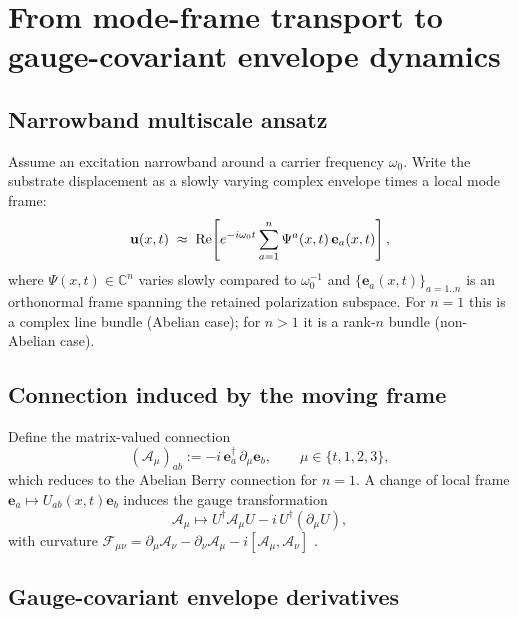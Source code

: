 \section{From mode-frame transport to gauge-covariant envelope dynamics}
\label{sec:effective-field}

\subsection{Narrowband multiscale ansatz}

Assume an excitation narrowband around a carrier frequency $\omega_0$.
Write the substrate displacement as a slowly varying complex envelope times a local mode frame:
\begin{equation}
  \mathbf{u}(x,t)\;\approx\;
  \mathrm{Re}\!\left[
    e^{-i\omega_0 t}\sum_{a=1}^{n}\Psi^a(x,t)\,\mathbf{e}_a(x,t)
  \right],
  \label{eq:multiscale-ansatz}
\end{equation}
where $\Psi(x,t)\in\mathbb{C}^n$ varies slowly compared to $\omega_0^{-1}$ and
$\{\mathbf{e}_a(x,t)\}_{a=1..n}$ is an orthonormal frame spanning the retained polarization subspace.
For $n=1$ this is a complex line bundle (Abelian case); for $n>1$ it is a rank-$n$ bundle (non-Abelian case).

\subsection{Connection induced by the moving frame}

Define the matrix-valued connection
\begin{equation}
  (\mathcal{A}_\mu)_{ab} := -i\,\mathbf{e}_a^\dagger\,\partial_\mu \mathbf{e}_b ,
  \qquad \mu\in\{t,1,2,3\},
  \label{eq:frame-connection}
\end{equation}
which reduces to the Abelian Berry connection for $n=1$.
A change of local frame $\mathbf{e}_a\mapsto U_{ab}(x,t)\mathbf{e}_b$ induces the gauge transformation
\begin{equation}
  \mathcal{A}_\mu \mapsto U^\dagger \mathcal{A}_\mu U - i\,U^\dagger(\partial_\mu U),
\end{equation}
with curvature $\mathcal{F}_{\mu\nu}=\partial_\mu\mathcal{A}_\nu-\partial_\nu\mathcal{A}_\mu-i[\mathcal{A}_\mu,\mathcal{A}_\nu]$
\citep{WilczekZee1984,Cisowski2022}.

\subsection{Gauge-covariant envelope derivatives}

